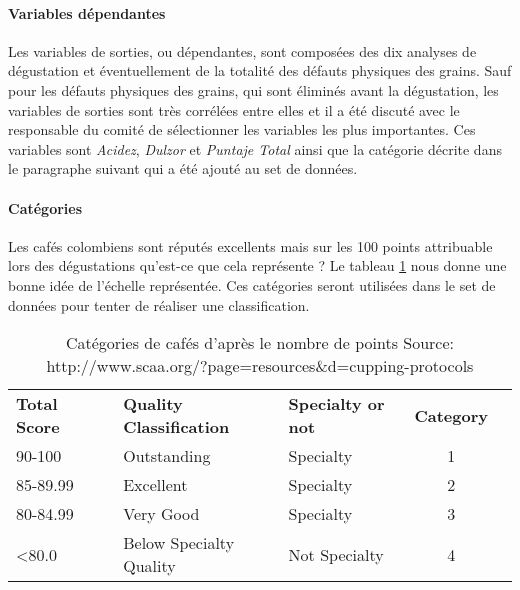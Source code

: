 





\paragraph{Variables dépendantes\label{VarDep}} Les variables de sorties, ou dépendantes, sont composées des dix analyses de dégustation et éventuellement de la totalité des défauts physiques des grains. Sauf pour les défauts physiques des grains, qui sont éliminés avant la dégustation, les variables de sorties sont très corrélées entre elles et il a été discuté avec le responsable du comité  de sélectionner les variables les plus importantes. Ces variables sont \textit{Acidez}, \textit{Dulzor} et \textit{Puntaje Total} ainsi que la catégorie décrite dans le paragraphe suivant qui a été ajouté au set de données.  

\paragraph{Catégories}
Les cafés colombiens sont réputés excellents mais sur les 100 points attribuable lors des dégustations qu'est-ce que cela représente ? Le tableau \ref{categoriesCafe} nous donne une bonne idée de l'échelle représentée. Ces catégories seront utilisées dans le set de données pour tenter de réaliser une classification. 
\begin{table}[H]
	\centering
	\caption{Catégories de cafés d'après le nombre de points \newline Source: http://www.scaa.org/?page=resources\&d=cupping-protocols \label{categoriesCafe}}
	\begin{tabular}{llllcl}
		\textbf{Total Score}   &  & \textbf{Quality Classification}   & \textbf{Specialty or not}  & \textbf{Category} \\
		
		90-100        &  & Outstanding              & Specialty         &  1                    \\
		85-89.99      &  & Excellent                & Specialty         &  2                    \\
		80-84.99      &  & Very Good                & Specialty         &  3                    \\
		\textless80.0 &  & Below Specialty Quality & Not Specialty     &  4                   
	\end{tabular}
\end{table}



